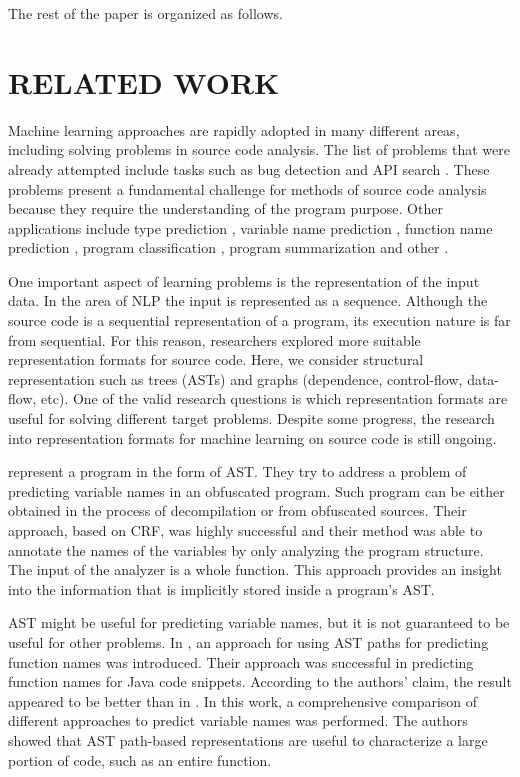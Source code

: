 \documentclass[a4paper,twoside]{article}
\begin{document}
The rest of the paper is organized as follows.

\section{\uppercase{Related Work}}

Machine learning approaches are rapidly adopted in many different areas, including solving problems in source code analysis. The list of problems that were already attempted include tasks such as bug detection \cite{Dinella2020} \cite{Wang2019} and API search \cite{Zhang2019} \cite{Wan2019}. These problems present a fundamental challenge for methods of source code analysis because they require the understanding of the program purpose. Other applications include type prediction \cite{Hellendoorn2018} \cite{Malik2019}, variable name prediction \cite{Cvitkovic2018} \cite{Bichsel2016}, function name prediction \cite{Lacomis2019} \cite{Alon2018}, program classification \cite{Ben-Nun2018} \cite{Zhou2019} \cite{Dam2019}, program summarization \cite{Fernandes2019} \cite{Shido2019} and other \cite{Nguyen2015} \cite{Yang2019} \cite{Chen2019} \cite{Drissi2018}.  

One important aspect of learning problems is the representation of the input data. In the area of NLP the input is represented as a sequence. Although the source code is a sequential representation of a program, its execution nature is far from sequential. For this reason, researchers explored more suitable representation formats for source code. Here, we consider structural representation such as trees (ASTs) and graphs (dependence, control-flow, data-flow, etc). One of the valid research questions is which representation formats are useful for solving different target problems. Despite some progress, the research into representation formats for machine learning on source code is still ongoing.

\cite{Raychev2015} represent a program in the form of AST. They try to address a problem of predicting variable names in an obfuscated program. Such program can be either obtained in the process of decompilation or from obfuscated sources. Their approach, based on CRF, was highly successful and their method was able to annotate the names of the variables by only analyzing the program structure. The input of the analyzer is a whole function. This approach provides an insight into the information that is implicitly stored inside a program's AST.

AST might be useful for predicting variable names, but it is not guaranteed to be useful for other problems. In \cite{Alon2018}, an approach for using AST paths for predicting function names was introduced. Their approach was successful in predicting function names for Java code snippets. According to the authors' claim, the result appeared to be better than in \cite{Raychev2015}. In this work, a comprehensive comparison of different approaches to predict variable names was performed. The authors showed that AST path-based representations are useful to characterize a large portion of code, such as an entire function. 
\end{document}
